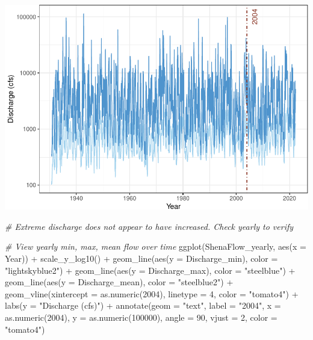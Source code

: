 \documentclass[
  12pt,
]{article}
\newenvironment{Shaded}{\begin{snugshade}}{\end{snugshade}}
\newcommand{\AttributeTok}[1]{\textcolor[rgb]{0.77,0.63,0.00}{#1}}
\newcommand{\CommentTok}[1]{\textcolor[rgb]{0.56,0.35,0.01}{\textit{#1}}}
\newcommand{\DecValTok}[1]{\textcolor[rgb]{0.00,0.00,0.81}{#1}}
\newcommand{\FunctionTok}[1]{\textcolor[rgb]{0.00,0.00,0.00}{#1}}
\newcommand{\NormalTok}[1]{#1}
\newcommand{\SpecialCharTok}[1]{\textcolor[rgb]{0.00,0.00,0.00}{#1}}
\newcommand{\StringTok}[1]{\textcolor[rgb]{0.31,0.60,0.02}{#1}}
\begin{document}
\includegraphics{Project_Template_files/figure-latex/Flow.analysis-1.pdf}

\begin{Shaded}
\begin{Highlighting}[]
\CommentTok{\# Extreme discharge does not appear to have increased. Check yearly to verify}

\CommentTok{\# View yearly min, max, mean flow over time}
\FunctionTok{ggplot}\NormalTok{(ShenaFlow\_yearly, }\FunctionTok{aes}\NormalTok{(}\AttributeTok{x =}\NormalTok{ Year)) }\SpecialCharTok{+}
  \FunctionTok{scale\_y\_log10}\NormalTok{() }\SpecialCharTok{+}
  \FunctionTok{geom\_line}\NormalTok{(}\FunctionTok{aes}\NormalTok{(}\AttributeTok{y =}\NormalTok{ Discharge\_min), }\AttributeTok{color =} \StringTok{"lightskyblue2"}\NormalTok{) }\SpecialCharTok{+}
  \FunctionTok{geom\_line}\NormalTok{(}\FunctionTok{aes}\NormalTok{(}\AttributeTok{y =}\NormalTok{ Discharge\_max), }\AttributeTok{color =} \StringTok{"steelblue"}\NormalTok{) }\SpecialCharTok{+}
  \FunctionTok{geom\_line}\NormalTok{(}\FunctionTok{aes}\NormalTok{(}\AttributeTok{y =}\NormalTok{ Discharge\_mean), }\AttributeTok{color =} \StringTok{"steelblue2"}\NormalTok{) }\SpecialCharTok{+}
  \FunctionTok{geom\_vline}\NormalTok{(}\AttributeTok{xintercept =} \FunctionTok{as.numeric}\NormalTok{(}\DecValTok{2004}\NormalTok{), }
             \AttributeTok{linetype =} \DecValTok{4}\NormalTok{, }\AttributeTok{color =} \StringTok{"tomato4"}\NormalTok{) }\SpecialCharTok{+}
  \FunctionTok{labs}\NormalTok{(}\AttributeTok{y =} \StringTok{"Discharge (cfs)"}\NormalTok{) }\SpecialCharTok{+}
  \FunctionTok{annotate}\NormalTok{(}\AttributeTok{geom =} \StringTok{"text"}\NormalTok{,}
           \AttributeTok{label =} \StringTok{"2004"}\NormalTok{,}
           \AttributeTok{x =} \FunctionTok{as.numeric}\NormalTok{(}\DecValTok{2004}\NormalTok{),}
           \AttributeTok{y =} \FunctionTok{as.numeric}\NormalTok{(}\DecValTok{100000}\NormalTok{),}
           \AttributeTok{angle =} \DecValTok{90}\NormalTok{, }
           \AttributeTok{vjust =} \DecValTok{2}\NormalTok{,}
           \AttributeTok{color =} \StringTok{"tomato4"}\NormalTok{)}
\end{Highlighting}
\end{Shaded}
\end{document}
